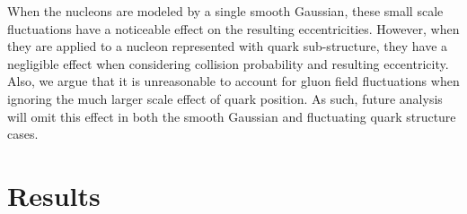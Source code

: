 \documentclass[preprint,showpacs,amsfonts,aps,prl,nofootinbib,floatfix]{revtex4}
\begin{document}
When the nucleons are modeled by a single smooth Gaussian, these small scale fluctuations have a noticeable effect on the resulting eccentricities. However, when they are applied to a nucleon represented with quark sub-structure, they have a negligible effect when considering collision probability and resulting eccentricity. Also, we argue that it is unreasonable to account for gluon field fluctuations when ignoring the much larger scale effect of quark position. As such, future analysis will omit this effect in both the smooth Gaussian and fluctuating quark structure cases.

\section{Results}
\label{sec:Results}
\end{document}
